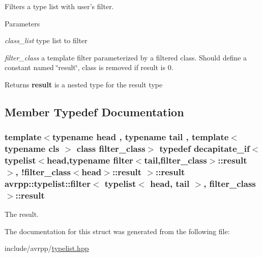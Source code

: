 Filters a type list with user's filter. 
\begin{DoxyParams}{Parameters}
\item[{\em class\_\-list}]type list to filter \item[{\em filter\_\-class}]a template filter parameterized by a filtered class. Should define a constant named \char`\"{}result\char`\"{}, class is removed if result is 0. \end{DoxyParams}
\begin{DoxyReturn}{Returns}
{\bfseries result} is a nested type for the result type 
\end{DoxyReturn}


\subsection{Member Typedef Documentation}
\hypertarget{structavrpp_1_1typelist_1_1filter_3_01typelist_3_01head_00_01tail_01_4_00_01filter__class_01_4_a4ece997a7b9f763306568cd70d242999}{
\subsubsection[{result}]{\setlength{\rightskip}{0pt plus 5cm}template$<$typename head , typename tail , template$<$ typename cls $>$ class filter\_\-class$>$ typedef decapitate\_\-if$<${\bf typelist}$<$head,typename filter$<$tail,filter\_\-class$>$::{\bf result} $>$, !filter\_\-class$<$head$>$::{\bf result} $>$::{\bf result} avrpp::typelist::filter$<$ {\bf typelist}$<$ head, tail $>$, filter\_\-class $>$::{\bf result}}}
\label{structavrpp_1_1typelist_1_1filter_3_01typelist_3_01head_00_01tail_01_4_00_01filter__class_01_4_a4ece997a7b9f763306568cd70d242999}


The result. 



The documentation for this struct was generated from the following file:\begin{DoxyCompactItemize}
\item 
include/avrpp/\hyperlink{typelist_8hpp}{typelist.hpp}\end{DoxyCompactItemize}
